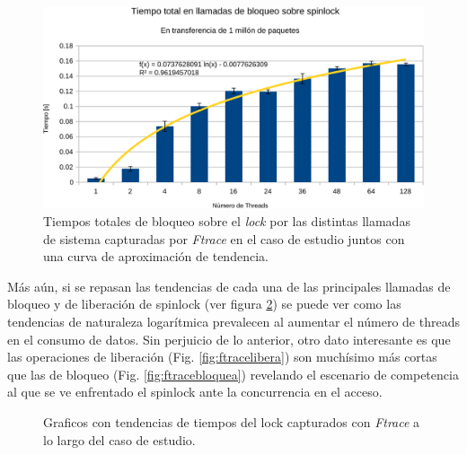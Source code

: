 \begin{figure}[!h]
	\centering
	\includegraphics[scale=.6]{resultados/sumaFtrace-crop.pdf}
	\caption{Tiempos totales de bloqueo sobre el \emph{lock} por las distintas llamadas de sistema capturadas por \emph{Ftrace} en el caso de estudio juntos con una curva de aproximación de tendencia.}
	\label{fig:sumaFtrace}
\end{figure}
Más aún, si se repasan las tendencias de cada una de las principales llamadas de bloqueo y de liberación de spinlock (ver figura \ref{fig:Ftracebloquealibera}) se puede ver como las tendencias de naturaleza logarítmica prevalecen al aumentar el número de threads en el consumo de datos. Sin perjuicio de lo anterior, otro dato interesante es que las operaciones de liberación (Fig. \ref{fig:ftracelibera}) son muchísimo más cortas que las de bloqueo (Fig. \ref{fig:ftracebloquea}) revelando el escenario de competencia al que se ve enfrentado el spinlock ante la concurrencia en el acceso.

\begin{figure}[h!]
	\centering
	\hspace*{\fill}
	\hfill
	\caption{Graficos con tendencias de tiempos del lock capturados con \emph{Ftrace} a lo largo del caso de estudio.}
	\label{fig:Ftracebloquealibera}
	\hspace*{\fill}
\end{figure}

